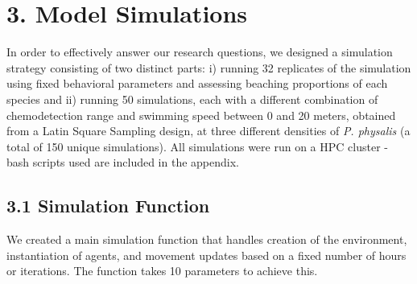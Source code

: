 \documentclass[
]{article}
\begin{document}
\hypertarget{model-simulations}{%
\section{3. Model Simulations}\label{model-simulations}}

In order to effectively answer our research questions, we designed a
simulation strategy consisting of two distinct parts: i) running 32
replicates of the simulation using fixed behavioral parameters and
assessing beaching proportions of each species and ii) running 50
simulations, each with a different combination of chemodetection range
and swimming speed between 0 and 20 meters, obtained from a Latin Square
Sampling design, at three different densities of \emph{P. physalis} (a
total of 150 unique simulations). All simulations were run on a HPC
cluster - bash scripts used are included in the appendix.

\hypertarget{simulation-function}{%
\subsection{3.1 Simulation Function}\label{simulation-function}}

We created a main simulation function that handles creation of the
environment, instantiation of agents, and movement updates based on a
fixed number of hours or iterations. The function takes 10 parameters to
achieve this.
\end{document}
